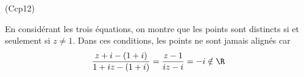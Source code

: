 \begin{tiny}(Ccp12)\end{tiny}
En considérant les trois équations, on montre que les points sont distincts si et seulement si $z\neq1$. Dans ces conditions, les points ne sont jamais alignés car
\begin{displaymath}
  \frac{z+i -(1+i)}{1+iz-(1+i)} = \frac{z-1}{iz-i} = -i \notin \R
\end{displaymath}

